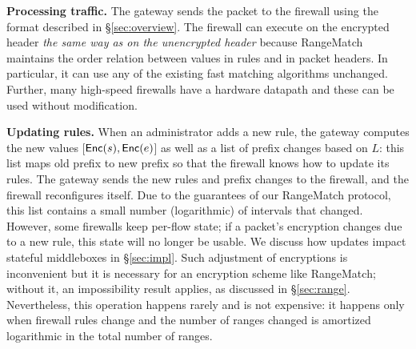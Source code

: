 \noindent\textbf{Processing traffic.}
The gateway sends the packet to the firewall using the format described in \S\ref{sec:overview}. The firewall can execute on the encrypted header {\em
the same way as on the unencrypted header} because RangeMatch maintains the order relation between values in rules and in 
packet headers. 
In particular, it can use any of the existing fast matching algorithms unchanged. 
Further, many high-speed firewalls have a hardware datapath and these can be used without modification.


\noindent\textbf{Updating rules.} 
When an administrator adds a new rule, the gateway computes the new values [$\mathsf{Enc}(s), \mathsf{Enc}(e)$] as well as a list of prefix changes based on $L$: this list maps old prefix to new prefix so that the firewall knows how to update its rules. 
The gateway sends the new rules and prefix changes to the firewall, and the firewall reconfigures itself. 
  Due to the guarantees of our RangeMatch protocol, this list contains a 
small number (logarithmic) of intervals that changed.
However, some firewalls keep per-flow state; if a packet's encryption changes due to a new rule, this state will no longer be usable.
We discuss how updates impact stateful middleboxes in \S\ref{sec:impl}.
Such adjustment of encryptions is inconvenient but it is  necessary for an encryption scheme like RangeMatch; without it, an impossibility result applies, as discussed in \S\ref{sec:range}. Nevertheless, this operation happens rarely and is not expensive: it happens only when firewall rules change and the number of ranges changed is  amortized logarithmic in the total number of ranges. 
 



